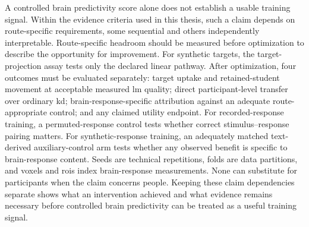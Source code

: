 A controlled brain predictivity score alone does not establish a usable training signal.
Within the evidence criteria used in this thesis, such a claim depends on route-specific requirements, some sequential and others independently interpretable.
Route-specific headroom should be measured before optimization to describe the opportunity for improvement.
For synthetic targets, the target-projection assay tests only the declared linear pathway.
After optimization, four outcomes must be evaluated separately: target uptake and retained-student movement at acceptable measured \ac{lm} quality; direct participant-level transfer over ordinary \ac{kd}; brain-response-specific attribution against an adequate route-appropriate control; and any claimed utility endpoint.
For recorded-response training, a permuted-response control tests whether correct stimulus--response pairing matters.
For synthetic-response training, an adequately matched text-derived auxiliary-control arm tests whether any observed benefit is specific to brain-response content.
Seeds are technical repetitions, folds are data partitions, and voxels and \acp{roi} index brain-response measurements.
None can substitute for participants when the claim concerns people.
Keeping these claim dependencies separate shows what an intervention achieved and what evidence remains necessary before controlled brain predictivity can be treated as a useful training signal.
